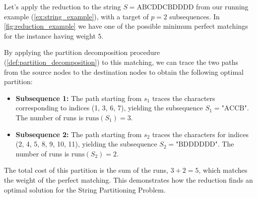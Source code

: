 \begin{example} \label{ex:reduction_ex}
    Let's apply the reduction to the string $S = \text{ABCDDCBDDDD}$ from our running example (\cref{ex:string_example}), with a target of $p=2$ subsequences. In \cref{fig:reduction_example} we have one of the possible minimum perfect matchings for the instance having weight $5$. 
    
    By applying the partition decomposition procedure (\cref{def:partition_decomposition}) to this matching, we can trace the two paths from the source nodes to the destination nodes to obtain the following optimal partition:
    \begin{itemize}
        \item \textbf{Subsequence 1:} The path starting from $s_1$ traces the characters corresponding to indices (1, 3, 6, 7), yielding the subsequence $S_1 = \text{"ACCB"}$. The number of runs is $\text{runs}(S_1) = 3$.
        \item \textbf{Subsequence 2:} The path starting from $s_2$ traces the characters for indices (2, 4, 5, 8, 9, 10, 11), yielding the subsequence $S_2 = \text{"BDDDDDD"}$. The number of runs is $\text{runs}(S_2) = 2$.
    \end{itemize}
    The total cost of this partition is the sum of the runs, $3 + 2 = 5$, which matches the weight of the perfect matching. This demonstrates how the reduction finds an optimal solution for the String Partitioning Problem.

    \begin{figure}[H]
        \centering
\end{figure}
\end{example}
